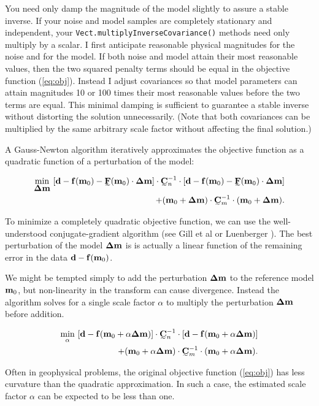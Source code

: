 \documentclass[12pt]{article}
\begin{document}
You need only damp the magnitude of the model
slightly to assure a stable inverse.  If your
noise and model samples are completely
stationary and independent, your
\texttt{Vect.multiply\-Inverse\-Covariance()}
methods need only multiply by a scalar.  I
first anticipate reasonable physical
magnitudes for the noise and for the model.
If both noise and model attain their most
reasonable values, then the two squared
penalty terms should be equal in the
objective function (\ref{eq:obj}).  Instead I
adjust covariances so that model parameters
can attain magnitudes 10 or 100 times their
most reasonable values before the two terms
are equal.  This minimal damping is
sufficient to guarantee a stable inverse
without distorting the solution
unnecessarily.  (Note that both covariances
can be multiplied by the same arbitrary scale
factor without affecting the final solution.)

A Gauss-Newton algorithm iteratively
approximates the objective function as a
quadratic function of a perturbation of the
model:

\begin{eqnarray}
\label{eq:qobj}
\min_{\dmv} ~  [\dv - \fv (\mzv) - \Ftz \cdot \dmv ] \cdot
 \Cni \cdot [\dv - \fv (\mzv) - \Ftz \cdot \dmv ] \nonumber \\
           + (\mzv + \dmv)  \cdot \Cmi \cdot (\mzv + \dmv).
\end{eqnarray}

\noindent To minimize a completely quadratic
objective function, we can use the
well-understood conjugate-gradient algorithm
(see Gill et al \cite{gill} or Luenberger
\cite{luenberger}).  The best perturbation of
the model ${{\mbox{\boldmath $\bf \Delta$}} {{\mbox{\boldmath $\bf m$}}}}$ is is actually a linear
function of the remaining error in the data
${{\mbox{\boldmath $\bf d$}}} - {{\mbox{\boldmath $\bf f$}}} ({{\mbox{\boldmath $\bf m$}}_0})$.

We might be tempted simply to add the
perturbation ${{\mbox{\boldmath $\bf \Delta$}} {{\mbox{\boldmath $\bf m$}}}}$ to the reference model
${{\mbox{\boldmath $\bf m$}}_0}$, but non-linearity in the transform
can cause divergence.  Instead the algorithm
solves for a single scale factor $\alpha$ to
multiply the perturbation ${{\mbox{\boldmath $\bf \Delta$}} {{\mbox{\boldmath $\bf m$}}}}$ before
addition.

\begin{eqnarray}
\min_{\alpha} ~  [\dv - \fv (\mzv + \alpha \dmv) ] \cdot
 \Cni \cdot [\dv - \fv (\mzv + \alpha \dmv) ] \nonumber \\
           + (\mzv + \alpha \dmv)  \cdot \Cmi \cdot (\mzv + \alpha \dmv).
\end{eqnarray}

\noindent Often in geophysical problems, the
original objective function (\ref{eq:obj})
has less curvature than the quadratic
approximation.  In such a case, the estimated
scale factor $\alpha$ can be expected to be
less than one.
\end{document}

